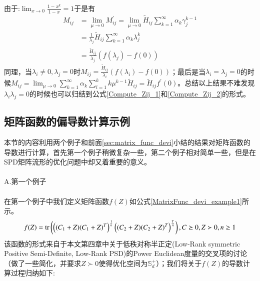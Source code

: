 由于:$\lim_{x\rightarrow 0}\frac{1-x^{k}}{1-x}=1$于是有
\begin{equation}
\label{ZerosEig_direction_gradient_M_1_1}
\begin{split}
M_{ij}&=\lim_{\mu \rightarrow 0} M_{ij}^{\prime}=\lim_{\mu \rightarrow 0} \tilde{H}_{ij}\sum_{k=1}^{\infty}\alpha_{k}\gamma_{j}^{k-1}\\
&=\frac{1}{\lambda_{j}}\tilde{H}_{ij}\sum_{k=1}^{\infty}\alpha_{k}\lambda_{j}^{k}\\
&=\frac{\tilde{H}_{ij}}{\lambda_{j}}(f(\lambda_{j})-f(0))
\end{split}
\end{equation}
同理，当$\lambda_i \neq 0,\lambda_j =0$时$M_{ij}=\frac{\tilde{H}_{ij}}{\lambda_{i}}(f(\lambda_{i})-f(0))$；最后是当$\lambda_i=\lambda_j=0$的时候$M_{ij}=\lim_{\mu \rightarrow 0}\sum_{k=1}^{\infty} \alpha_{k}\sum_{l=1}^{k}k\mu^{k-1}\tilde{H}_{ij}=\tilde{H}_{ij}f^{\prime}(0)$。总结以上结果不难发现$\lambda_i \lambda_j=0$的时候也可以归结到公式\ref{Compute_Zij_1}和\ref{Compute_Zij_2}的形式。
\subsection{矩阵函数的偏导数计算示例}
\label{sec:matrix_func_devi_examples}
本节的内容利用两个例子和前面\ref{sec:matrix_func_devi}小结的结果对矩阵函数的导数进行计算，首先第一个例子稍微复杂一些，第二个例子相对简单一些，但是在SPD矩阵流形的优化问题中却又着重要的意义。\\\\
{\heiti A.第一个例子}\\\\
在第一个例子中我们定义矩阵函数$f(Z)$如公式\ref{MatrixFunc_devi_example1}所示。
\begin{equation}
\label{MatrixFunc_devi_example1}
f(Z)={\rm tr}\left(\left((C_1+Z)(C_1+Z)^{T}\right)^{\frac{1}{n}}\left((C_2+Z)(C_2+Z)^{T}\right)^{\frac{T}{n}}\right),C\succeq 0,Z\succ 0,n\geq 1
\end{equation}
该函数的形式来自于本文第四章中关于低秩对称半正定(Low-Rank symmetric Positive Semi-Definite, Low-Rank PSD)的Power Euclidean度量的交叉项的讨论（做了一些简化，并要求$Z \succ 0$使得优化空间为$\mathbb{S}_{d}^{+}$）；我们将关于$f(Z)$的导数计算过程归纳如下:


